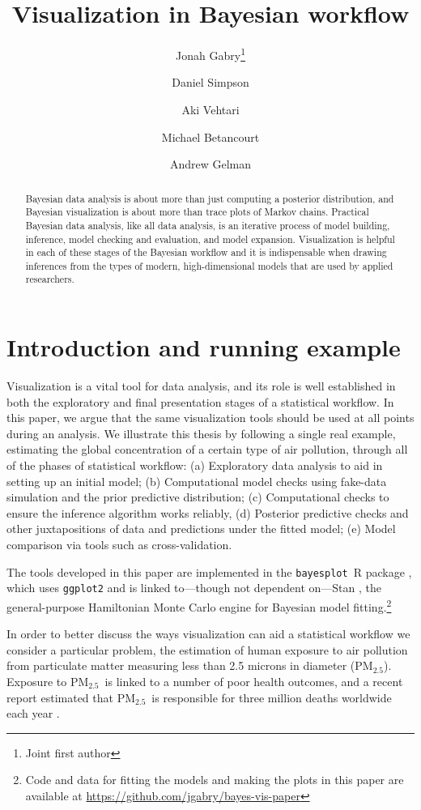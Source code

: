 \documentclass{statsoc}
\title{Visualization in Bayesian workflow}
\author[Gabry {\it et al.}]{Jonah Gabry\footnote{Joint first author}}
\author[Gabry {\it et al.}]{Daniel Simpson\footnotemark[1]}
\author[Gabry {\it et al.}]{Aki Vehtari}
\author[Gabry {\it et al.}]{Michael Betancourt}
\author[Gabry {\it et al.}]{Andrew Gelman}
\newcommand{\PM}{PM$_{2.5}$}
\newcommand{\bayesplot}{{\tt bayesplot}}
\begin{document}
\maketitle

\begin{abstract}
Bayesian data analysis is about more than just computing a posterior
distribution, and Bayesian visualization is about more than trace plots of
Markov chains. Practical Bayesian data analysis, like all data analysis, is an
iterative process of model building, inference, model checking and evaluation,
and model expansion. Visualization is helpful in each of these stages of the
Bayesian workflow and it is indispensable when drawing inferences from the types
of  modern, high-dimensional models that are used by applied researchers.
\end{abstract}


\section{Introduction and running example}
\label{sec:intro}

Visualization is a vital tool for data analysis, and its role is
well established in both the exploratory and final presentation stages of a
statistical workflow. In this paper, we argue that the same visualization tools
should be used at all points during an analysis.  We illustrate this thesis by
following a single real example, estimating the global concentration of a
certain type of air pollution, through all of the phases of statistical
workflow:
(a) Exploratory data analysis to aid in setting up an initial model;
(b) Computational model checks using fake-data simulation and the prior
      predictive distribution;
(c) Computational checks to ensure the inference algorithm works reliably,
(d) Posterior predictive checks and other juxtapositions of data and predictions
      under the fitted model;
(e)  Model comparison via tools such as cross-validation.

The tools developed in this paper are implemented in the \bayesplot\ R package
\citep{bayesplotRpackage, rcore}, which uses {\tt ggplot2} \citep{ggplot2Rpackage}
and is linked to---though not dependent on---Stan \citep{rstan,stanmanual},
the general-purpose Hamiltonian Monte Carlo engine for Bayesian model 
fitting.\footnote{Code and data for fitting the models and making the plots in this paper 
are available at \url{https://github.com/jgabry/bayes-vis-paper}}

In order to better discuss the ways visualization can aid a statistical
workflow we consider a particular problem, the estimation of human exposure to
air pollution from particulate matter measuring less than 2.5 microns in
diameter (\PM). Exposure to \PM\ is linked to a number of poor health outcomes,
and a recent report estimated that \PM\ is responsible for three million deaths
worldwide each year \citep{shaddick2017data}.
\end{document}
